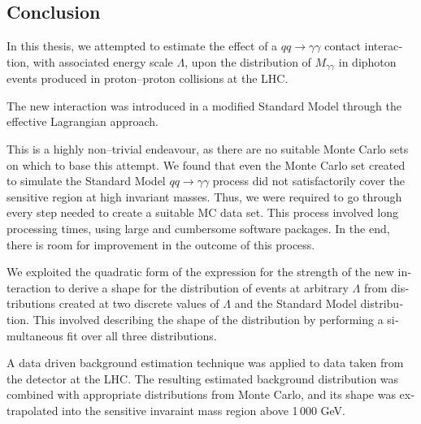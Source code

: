 



%


\begin{english}












\chapter{Conclusion}
In this thesis, we attempted to estimate the effect of a $qq\rightarrow\gamma\gamma$ contact interaction, with associated energy scale $\Lambda$, upon the distribution of $M_{\gamma\gamma}$ in diphoton events produced in proton--proton collisions at the LHC.

The new interaction was introduced in a modified Standard Model through the effective Lagrangian approach.

This is a highly non--trivial endeavour, as there are no suitable \atlas{} Monte Carlo sets on which to base this attempt. We found that even the Monte Carlo set created to simulate the Standard Model $qq\rightarrow\gamma\gamma$ process did not satisfactorily cover the sensitive region at high invariant masses. Thus, we were required to go through every step needed to create a suitable MC data set. This process involved long processing times, using large and cumbersome software packages. In the end, there is room for improvement in the outcome of this process.

We exploited the quadratic form of the expression for the strength of the new interaction to derive a shape for the distribution of events at arbitrary $\Lambda$ from distributions created at two discrete values of $\Lambda$ and the Standard Model distribution. This involved describing the shape of the distribution by performing a simultaneous fit over all three distributions.

A data driven background estimation technique was applied to data taken from the \atlas{} detector at the LHC. The resulting estimated background distribution was combined with appropriate distributions from Monte Carlo, and its shape was extrapolated into the sensitive invaraint mass region above 1\,000 GeV.


\end{english}
